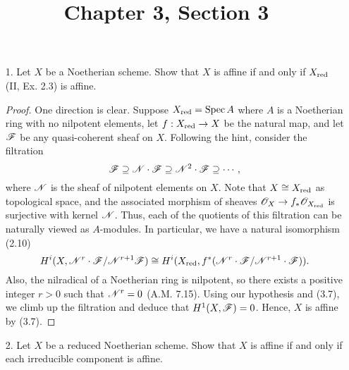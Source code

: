 \documentclass{article}
\title{Chapter 3, Section 3}
\begin{document}
\maketitle
\begin{enumerate} [label=\textbf{\arabic*.}, leftmargin=0em]

\item[1.] Let $X$ be a Noetherian scheme.
Show that $X$ is affine if and only if $X_{\text{red}}$ (II, Ex. 2.3) is affine.

\begin{proof}
  One direction is clear.
  Suppose $X_{\text{red}} = \operatorname{Spec}{A}$ where $A$ is a Noetherian ring with no nilpotent elements, let $f : X_{\text{red}} \to X$ be the natural map, and let $\mathscr{F}$ be any quasi-coherent sheaf on $X$. 
  Following the hint, consider the filtration
  \begin{equation*}
    \mathscr{F} \supseteq \mathscr{N} \cdot \mathscr{F} \supseteq \mathscr{N}^2 \cdot \mathscr{F} \supseteq \cdots,
  \end{equation*}
  where $\mathscr{N}$ is the sheaf of nilpotent elements on $X$.
  Note that $X \cong X_{\text{red}}$ as topological space, and the associated morphism of sheaves $\mathscr{O}_X \to f_* \mathscr{O}_{X_{\text{red}}}$ is surjective with kernel $\mathscr{N}$.
  Thus, each of the quotients of this filtration can be naturally viewed as $A$-modules.
  In particular, we have a natural isomorphism (2.10) $$H^i(X, \mathscr{N}^r \cdot \mathscr{F} / \mathscr{N}^{r + 1} \mathscr{F}) \cong H^i(X_{\text{red}}, f^*(\mathscr{N}^r \cdot \mathscr{F} / \mathscr{N}^{r + 1} \cdot \mathscr{F})).$$
  Also, the nilradical of a Noetherian ring is nilpotent, so there exists a positive integer $r > 0$ such that $\mathscr{N}^r = 0$ (A.M. 7.15).
  Using our hypothesis and (3.7), we climb up the filtration and deduce that $H^1(X, \mathscr{F}) = 0$.
  Hence, $X$ is affine by (3.7).
\end{proof}

\item[2.] Let $X$ be a reduced Noetherian scheme.
Show that $X$ is affine if and only if each irreducible component is affine.


\end{enumerate}
\end{document}
